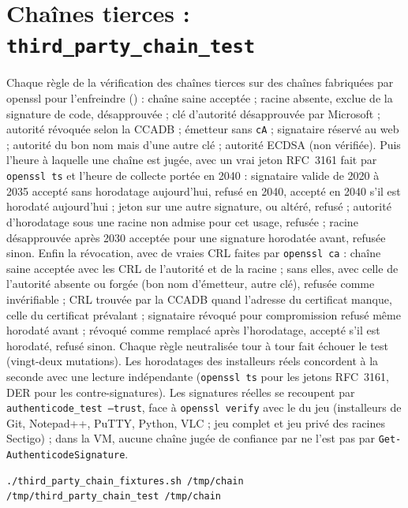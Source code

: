 \documentclass[11pt,a4paper,oneside]{report}
\begin{document}
\section{Chaînes tierces : \texttt{third\_party\_chain\_test}}

Chaque règle de la vérification des chaînes tierces sur des chaînes
fabriquées par openssl pour l'enfreindre () :
chaîne saine acceptée ; racine absente, exclue de la signature de code,
désapprouvée ; clé d'autorité désapprouvée par Microsoft ; autorité révoquée
selon la CCADB ; émetteur sans \texttt{cA} ; signataire réservé au web ;
autorité du bon nom mais d'une autre clé ; autorité ECDSA (non vérifiée).
Puis l'heure à laquelle une chaîne est jugée, avec un vrai jeton RFC~3161 fait
par \texttt{openssl ts} et l'heure de collecte portée en 2040 : signataire
valide de 2020 à 2035 accepté sans horodatage aujourd'hui, refusé en 2040,
accepté en 2040 s'il est horodaté aujourd'hui ; jeton sur une autre
signature, ou altéré, refusé ; autorité d'horodatage sous une racine non
admise pour cet usage, refusée ; racine désapprouvée après 2030 acceptée pour
une signature horodatée avant, refusée sinon. Enfin la révocation, avec de
vraies CRL faites par \texttt{openssl ca} : chaîne saine acceptée avec les CRL
de l'autorité et de la racine ; sans elles, avec celle de l'autorité absente ou
forgée (bon nom d'émetteur, autre clé), refusée comme invérifiable ; CRL
trouvée par la CCADB quand l'adresse du certificat manque, celle du certificat
prévalant ; signataire révoqué pour compromission refusé même horodaté avant ;
révoqué comme remplacé après l'horodatage, accepté s'il est horodaté, refusé
sinon. Chaque règle neutralisée tour à tour fait échouer le test (vingt-deux
mutations). Les horodatages des installeurs
réels concordent à la seconde avec une lecture indépendante (\texttt{openssl
ts} pour les jetons RFC~3161, DER pour les contre-signatures).
Les signatures réelles se recoupent par \texttt{authenticode\_test --trust},
face à \texttt{openssl verify} avec le  du jeu (installeurs
de Git, Notepad++, PuTTY, Python, VLC ; jeu complet et jeu privé des racines
Sectigo) ; dans la VM, aucune chaîne jugée de confiance par \wac{} ne l'est
pas par \texttt{Get-AuthenticodeSignature}.

\begin{lstlisting}
./third_party_chain_fixtures.sh /tmp/chain
/tmp/third_party_chain_test /tmp/chain
\end{lstlisting}
\end{document}
